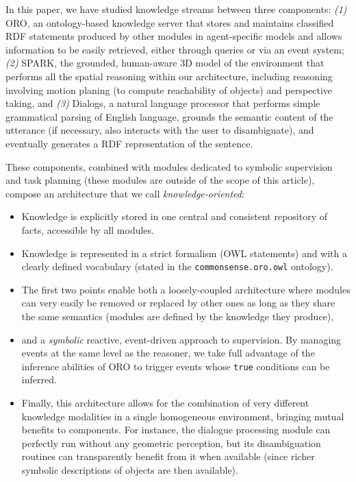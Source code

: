 \documentclass{svmult}
\begin{document}
In this paper, we have studied knowledge streams between three components: {\it(1)}
{\sc ORO}, an ontology-based knowledge server that stores and maintains
classified RDF statements produced by other modules in agent-specific
models and allows information to be easily retrieved, either through queries or
via an event system; {\it(2)} {\sc SPARK}, the grounded, human-aware 3D model
of the environment that performs all the spatial reasoning within our
architecture, including reasoning involving motion planing (to compute
reachability of objects) and perspective taking, and {\it(3)} {\sc Dialogs}, a
natural language processor that performs simple grammatical parsing of English
language, grounds the semantic content of the utterance (if necessary, also
interacts with the user to disambiguate), and eventually generates a RDF
representation of the sentence.

These components, combined with modules dedicated to symbolic supervision and
task planning (these modules are outside of the scope of this article), compose
an architecture that we call \emph{knowledge-oriented}:

\begin{itemize}
\item{Knowledge is explicitly stored in one central and consistent repository
of facts, accessible by all modules.}
\item{Knowledge is represented in a strict formalism (OWL statements) and
with a clearly defined vocabulary (stated in the {\tt commonsense.oro.owl}
ontology).}
\item{The first two points enable both a loosely-coupled
architecture where modules can very easily be removed or replaced by other ones
as long as they share the same semantics (modules are defined by the knowledge
they produce),}
\item{and a \emph{symbolic} reactive, event-driven approach
to supervision. By managing events at the same level as
the reasoner, we take full advantage of the inference abilities of ORO to
trigger events whose \texttt{true} conditions can be inferred.}
\item{Finally, this architecture allows for the combination of very different knowledge
modalities in a single homogeneous environment, bringing mutual benefits to
components. For instance, the dialogue processing module can perfectly run
without any geometric perception, but its disambiguation routines can
transparently benefit from it when available (since richer symbolic
descriptions of objects are then available).}
\end{itemize}
\end{document}

